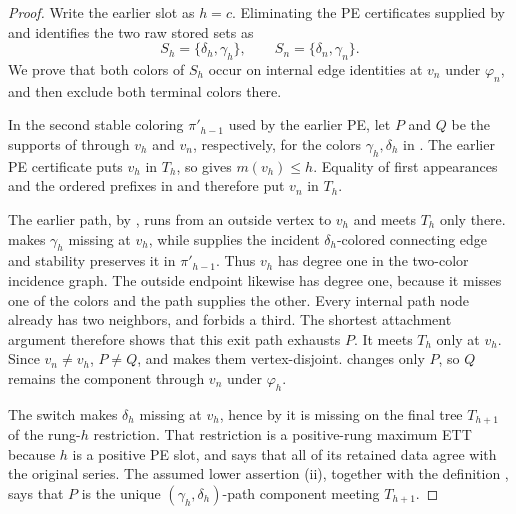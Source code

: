 \begin{proof}
Write the earlier slot as \(h=c\).  Eliminating the PE certificates supplied
by  and  identifies
the two raw stored sets as
\[
 S_h=\{\delta_h,\gamma_h\},\qquad
 S_n=\{\delta_n,\gamma_n\}.                                   \tag{1}
\]
We prove that both colors of \(S_h\) occur on internal edge identities at
\(v_n\) under \(\varphi_n\), and then exclude both terminal colors there.

In the second stable coloring \(\pi'_{h-1}\) used by the earlier PE, let
\(P\) and \(Q\) be the supports of  through
\(v_h\) and \(v_n\), respectively, for the colors
\(\gamma_h,\delta_h\) in .  The earlier PE
certificate puts \(v_h\) in \(T_h\), so
 gives \(m(v_h)\le h\).  Equality of first
appearances and the ordered prefixes in  and
 therefore put \(v_n\) in \(T_h\).

The earlier  path, by , runs from an
outside vertex to \(v_h\) and meets \(T_h\) only there.
 makes \(\gamma_h\) missing at \(v_h\),
while  supplies the incident
\(\delta_h\)-colored connecting edge and stability preserves it in
\(\pi'_{h-1}\).  Thus \(v_h\) has degree one in the two-color incidence
graph.  The outside endpoint likewise has degree one, because it misses one
of the colors and the path supplies the other.  Every internal path node
already has two neighbors, and
 forbids a third.  The shortest
attachment argument therefore shows that this exit path exhausts \(P\).
It meets \(T_h\) only at \(v_h\).  Since \(v_n\ne v_h\), \(P\ne Q\), and
 makes them vertex-disjoint.
 changes only \(P\), so \(Q\) remains the
component through \(v_n\) under \(\varphi_h\).

The switch makes \(\delta_h\) missing at \(v_h\), hence by
 it is missing on the final tree \(T_{h+1}\) of
the rung-\(h\) restriction.  That restriction is a
positive-rung maximum ETT because \(h\) is a positive PE slot, and
 says that all of its retained data agree
with the original series.  The assumed lower
assertion (ii), together with the definition
, says that \(P\) is the unique
\((\gamma_h,\delta_h)\)-path component meeting \(T_{h+1}\).


\end{proof}
